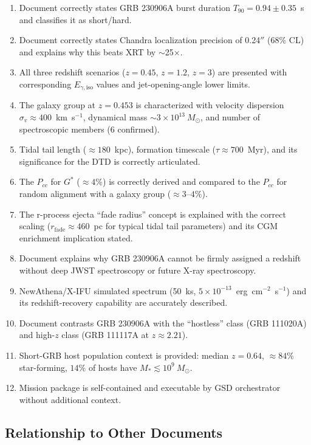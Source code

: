 \documentclass[11pt,letterpaper]{article}
\begin{document}
\begin{enumerate}[leftmargin=*, label=\textbf{SC\arabic*.}]
  \item Document correctly states GRB 230906A burst duration $T_{90} = 0.94 \pm 0.35$~s and classifies it as short/hard.
  \item Document correctly states Chandra localization precision of 0.24$''$ (68\% CL) and explains why this beats XRT by $\sim$25$\times$.
  \item All three redshift scenarios ($z=0.45$, $z=1.2$, $z=3$) are presented with corresponding $E_{\gamma,\text{iso}}$ values and jet-opening-angle lower limits.
  \item The galaxy group at $z = 0.453$ is characterized with velocity dispersion $\sigma_v \approx 400$~km~s$^{-1}$, dynamical mass $\sim 3 \times 10^{13}~M_\odot$, and number of spectroscopic members (6 confirmed).
  \item Tidal tail length ($\approx 180$~kpc), formation timescale ($\tau \approx 700$~Myr), and its significance for the DTD is correctly articulated.
  \item The $P_{cc}$ for $G^*$ ($\approx 4\%$) is correctly derived and compared to the $P_{cc}$ for random alignment with a galaxy group ($\approx 3$--$4\%$).
  \item The r-process ejecta ``fade radius'' concept is explained with the correct scaling ($r_{\text{fade}} \approx 460$~pc for typical tidal tail parameters) and its CGM enrichment implication stated.
  \item Document explains why GRB 230906A cannot be firmly assigned a redshift without deep JWST spectroscopy or future X-ray spectroscopy.
  \item NewAthena/X-IFU simulated spectrum (50~ks, $5 \times 10^{-13}$~erg~cm$^{-2}$~s$^{-1}$) and its redshift-recovery capability are accurately described.
  \item Document contrasts GRB 230906A with the ``hostless'' class (GRB 111020A) and high-$z$ class (GRB 111117A at $z \approx 2.21$).
  \item Short-GRB host population context is provided: median $z = 0.64$, $\approx 84\%$ star-forming, $14\%$ of hosts have $M_* \lesssim 10^9~M_\odot$.
  \item Mission package is self-contained and executable by GSD orchestrator without additional context.
\end{enumerate}

\subsection{Relationship to Other Documents}
\end{document}
